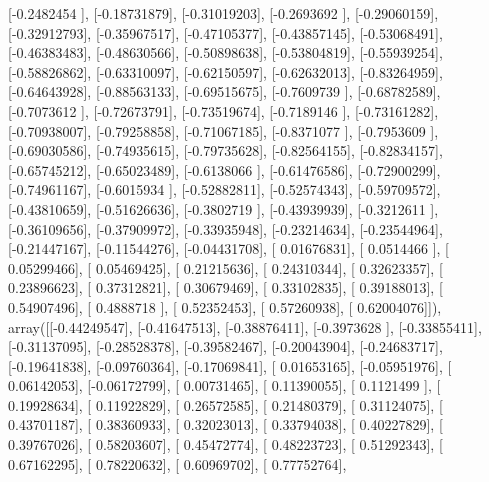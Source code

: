 \documentclass{article}
\begin{document}
       [-0.2482454 ],
       [-0.18731879],
       [-0.31019203],
       [-0.2693692 ],
       [-0.29060159],
       [-0.32912793],
       [-0.35967517],
       [-0.47105377],
       [-0.43857145],
       [-0.53068491],
       [-0.46383483],
       [-0.48630566],
       [-0.50898638],
       [-0.53804819],
       [-0.55939254],
       [-0.58826862],
       [-0.63310097],
       [-0.62150597],
       [-0.62632013],
       [-0.83264959],
       [-0.64643928],
       [-0.88563133],
       [-0.69515675],
       [-0.7609739 ],
       [-0.68782589],
       [-0.7073612 ],
       [-0.72673791],
       [-0.73519674],
       [-0.7189146 ],
       [-0.73161282],
       [-0.70938007],
       [-0.79258858],
       [-0.71067185],
       [-0.8371077 ],
       [-0.7953609 ],
       [-0.69030586],
       [-0.74935615],
       [-0.79735628],
       [-0.82564155],
       [-0.82834157],
       [-0.65745212],
       [-0.65023489],
       [-0.6138066 ],
       [-0.61476586],
       [-0.72900299],
       [-0.74961167],
       [-0.6015934 ],
       [-0.52882811],
       [-0.52574343],
       [-0.59709572],
       [-0.43810659],
       [-0.51626636],
       [-0.3802719 ],
       [-0.43939939],
       [-0.3212611 ],
       [-0.36109656],
       [-0.37909972],
       [-0.33935948],
       [-0.23214634],
       [-0.23544964],
       [-0.21447167],
       [-0.11544276],
       [-0.04431708],
       [ 0.01676831],
       [ 0.0514466 ],
       [ 0.05299466],
       [ 0.05469425],
       [ 0.21215636],
       [ 0.24310344],
       [ 0.32623357],
       [ 0.23896623],
       [ 0.37312821],
       [ 0.30679469],
       [ 0.33102835],
       [ 0.39188013],
       [ 0.54907496],
       [ 0.4888718 ],
       [ 0.52352453],
       [ 0.57260938],
       [ 0.62004076]]), array([[-0.44249547],
       [-0.41647513],
       [-0.38876411],
       [-0.3973628 ],
       [-0.33855411],
       [-0.31137095],
       [-0.28528378],
       [-0.39582467],
       [-0.20043904],
       [-0.24683717],
       [-0.19641838],
       [-0.09760364],
       [-0.17069841],
       [ 0.01653165],
       [-0.05951976],
       [ 0.06142053],
       [-0.06172799],
       [ 0.00731465],
       [ 0.11390055],
       [ 0.1121499 ],
       [ 0.19928634],
       [ 0.11922829],
       [ 0.26572585],
       [ 0.21480379],
       [ 0.31124075],
       [ 0.43701187],
       [ 0.38360933],
       [ 0.32023013],
       [ 0.33794038],
       [ 0.40227829],
       [ 0.39767026],
       [ 0.58203607],
       [ 0.45472774],
       [ 0.48223723],
       [ 0.51292343],
       [ 0.67162295],
       [ 0.78220632],
       [ 0.60969702],
       [ 0.77752764],
\end{document}
